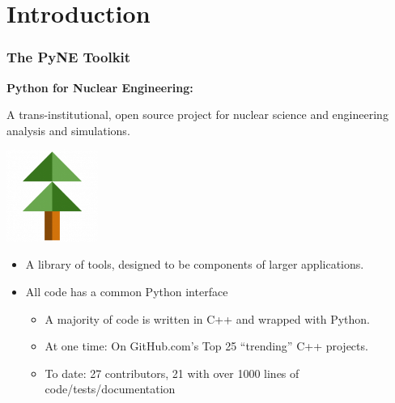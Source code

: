 \documentclass[12pt]{beamer}
\begin{document}
\section{Introduction}
\begin{frame}[fragile]
\frametitle{The PyNE Toolkit}

\centerline{\bf Python for Nuclear Engineering:}
A trans-institutional, open source project for nuclear science and engineering analysis and simulations.

\centerline{\includegraphics[width=3cm]{figures/pyne_icon_small.png}}

\begin{itemize}
\item{A library of tools, designed to be components of larger applications.}
\item{All code has a common Python interface}
\begin{itemize}
\item{A majority of code is written in C++ and wrapped with Python.}
\item{At one time: On GitHub.com's Top 25 ``trending'' C++ projects.}
\item{To date: 27 contributors, 21 with over 1000 lines of code/tests/documentation}
\end{itemize}
\end{itemize}


\end{frame}
\end{document}
